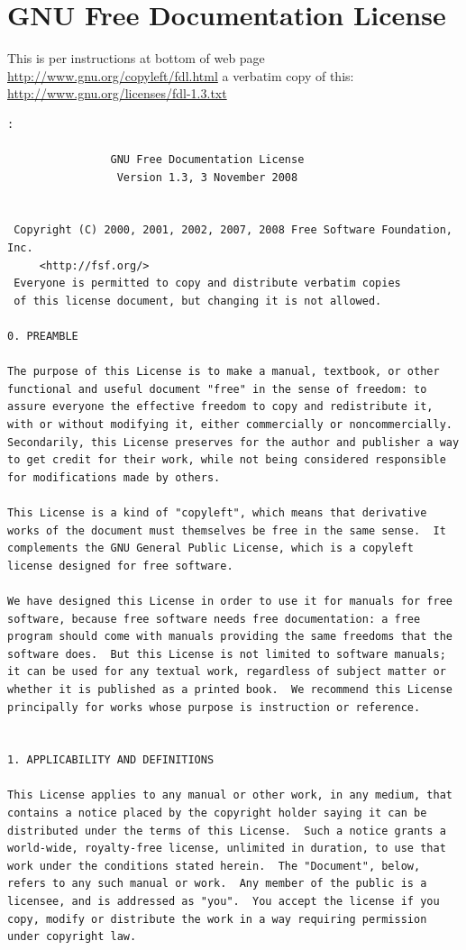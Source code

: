 \documentclass[a4paper]{report}
\begin{document}
\chapter{GNU Free Documentation License}
This is per instructions at bottom of web page \url{http://www.gnu.org/copyleft/fdl.html} a verbatim copy of this: \url{http://www.gnu.org/licenses/fdl-1.3.txt}
\begin{verbatim}:

                GNU Free Documentation License
                 Version 1.3, 3 November 2008


 Copyright (C) 2000, 2001, 2002, 2007, 2008 Free Software Foundation, Inc.
     <http://fsf.org/>
 Everyone is permitted to copy and distribute verbatim copies
 of this license document, but changing it is not allowed.

0. PREAMBLE

The purpose of this License is to make a manual, textbook, or other
functional and useful document "free" in the sense of freedom: to
assure everyone the effective freedom to copy and redistribute it,
with or without modifying it, either commercially or noncommercially.
Secondarily, this License preserves for the author and publisher a way
to get credit for their work, while not being considered responsible
for modifications made by others.

This License is a kind of "copyleft", which means that derivative
works of the document must themselves be free in the same sense.  It
complements the GNU General Public License, which is a copyleft
license designed for free software.

We have designed this License in order to use it for manuals for free
software, because free software needs free documentation: a free
program should come with manuals providing the same freedoms that the
software does.  But this License is not limited to software manuals;
it can be used for any textual work, regardless of subject matter or
whether it is published as a printed book.  We recommend this License
principally for works whose purpose is instruction or reference.


1. APPLICABILITY AND DEFINITIONS

This License applies to any manual or other work, in any medium, that
contains a notice placed by the copyright holder saying it can be
distributed under the terms of this License.  Such a notice grants a
world-wide, royalty-free license, unlimited in duration, to use that
work under the conditions stated herein.  The "Document", below,
refers to any such manual or work.  Any member of the public is a
licensee, and is addressed as "you".  You accept the license if you
copy, modify or distribute the work in a way requiring permission
under copyright law.


\end{verbatim}
\end{document}

